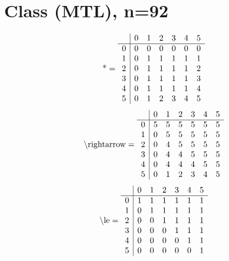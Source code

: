 \documentclass[11pt]{article}
\begin{document}
\section{Class (MTL), n=92}
\[\text{*} = 
\begin{array}{r | r r r r r r}
 & 0 & 1 & 2 & 3 & 4 & 5 \\ \hline
0 & 0 & 0 & 0 & 0 & 0 & 0 \\
1 & 0 & 1 & 1 & 1 & 1 & 1 \\
2 & 0 & 1 & 1 & 1 & 1 & 2 \\
3 & 0 & 1 & 1 & 1 & 1 & 3 \\
4 & 0 & 1 & 1 & 1 & 1 & 4 \\
5 & 0 & 1 & 2 & 3 & 4 & 5 \\
\end{array}
\]
\[\text{\textbackslash rightarrow} = 
\begin{array}{r | r r r r r r}
 & 0 & 1 & 2 & 3 & 4 & 5 \\ \hline
0 & 5 & 5 & 5 & 5 & 5 & 5 \\
1 & 0 & 5 & 5 & 5 & 5 & 5 \\
2 & 0 & 4 & 5 & 5 & 5 & 5 \\
3 & 0 & 4 & 4 & 5 & 5 & 5 \\
4 & 0 & 4 & 4 & 4 & 5 & 5 \\
5 & 0 & 1 & 2 & 3 & 4 & 5 \\
\end{array}
\]
\[\text{\textbackslash le} = 
\begin{array}{r | r r r r r r}
 & 0 & 1 & 2 & 3 & 4 & 5 \\ \hline
0 & 1 & 1 & 1 & 1 & 1 & 1 \\
1 & 0 & 1 & 1 & 1 & 1 & 1 \\
2 & 0 & 0 & 1 & 1 & 1 & 1 \\
3 & 0 & 0 & 0 & 1 & 1 & 1 \\
4 & 0 & 0 & 0 & 0 & 1 & 1 \\
5 & 0 & 0 & 0 & 0 & 0 & 1 \\
\end{array}
\]
\end{document}
